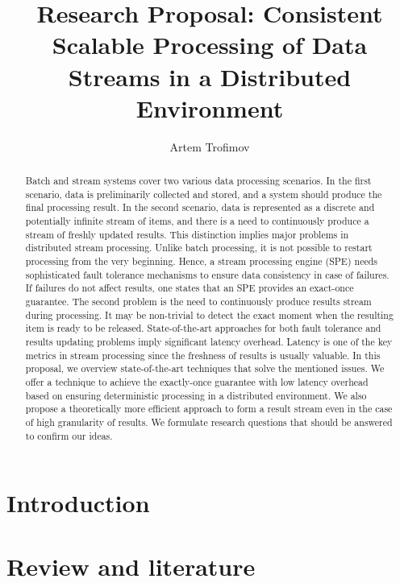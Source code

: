 \documentclass[runningheads]{llncs}
\begin{document}
\title {Research Proposal: Consistent Scalable Processing of Data Streams in  a Distributed Environment
}
\author{Artem Trofimov}

\maketitle

\begin{abstract}
Batch and stream systems cover two various data processing scenarios. In the first scenario, data is preliminarily collected and stored, and a system should produce the final processing result. In the second scenario, data is represented as a discrete and potentially infinite stream of items, and there is a need to continuously produce a stream of freshly updated results. This distinction implies major problems in distributed stream processing. Unlike batch processing, it is not possible to restart processing from the very beginning. Hence, a stream processing engine (SPE) needs sophisticated fault tolerance mechanisms to ensure data consistency in case of failures. If failures do not affect results, one states that an SPE provides an exact-once guarantee. The second problem is the need to continuously produce results stream during processing. It may be non-trivial to detect the exact moment when the resulting item is ready to be released. State-of-the-art approaches for both fault tolerance and results updating problems imply significant latency overhead. Latency is one of the key metrics in stream processing since the freshness of results is usually valuable. In this proposal, we overview state-of-the-art techniques that solve the mentioned issues. We offer a technique to achieve the exactly-once guarantee with low latency overhead based on ensuring deterministic processing in a distributed environment. We also propose a theoretically more efficient approach to form a result stream even in the case of high granularity of results. We formulate research questions that should be answered to confirm our ideas. 
\end{abstract}

\section {Introduction}

\section {Review and literature}

\end{document}
